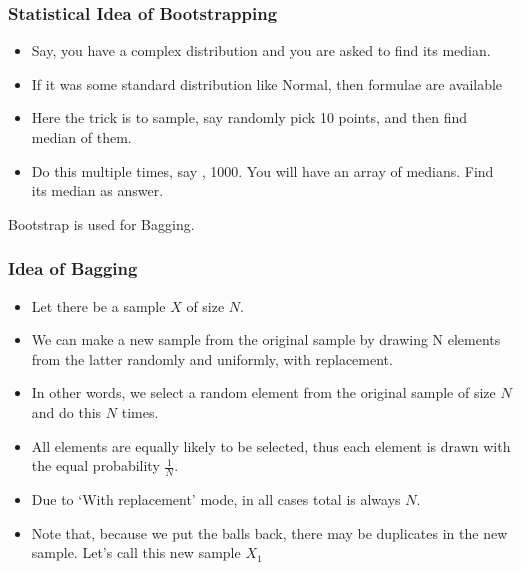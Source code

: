 \begin{frame}[fragile]\frametitle{Statistical Idea of Bootstrapping}
\begin{itemize}
\item Say, you have a complex distribution and you are asked to find its median.
\item If it was some standard distribution like Normal, then formulae are available
\item Here the trick is to sample, say randomly pick 10 points, and then find median of them.
\item Do this multiple times, say , 1000. You will have an array of medians. Find its median as answer.
\end{itemize}

\begin{center}
\end{center}
Bootstrap is used for Bagging.
\end{frame}


\begin{frame}[fragile]\frametitle{Idea of Bagging}
\begin{itemize}
\item Let there be a sample $X$ of size $N$. 
\item We can make a new sample from the original sample by drawing N elements from the latter randomly and uniformly, with replacement. 
\item In other words, we select a random element from the original sample of size $N$ and do this $N$ times. 
\item All elements are equally likely to be selected, thus each element is drawn with the equal probability $\frac{1}{N}$.
\item Due to `With replacement' mode, in all cases total is always $N$.
\item Note that, because we put the balls back, there may be duplicates in the new sample. Let's call this new sample $X_1$
\end{itemize}
\end{frame}

